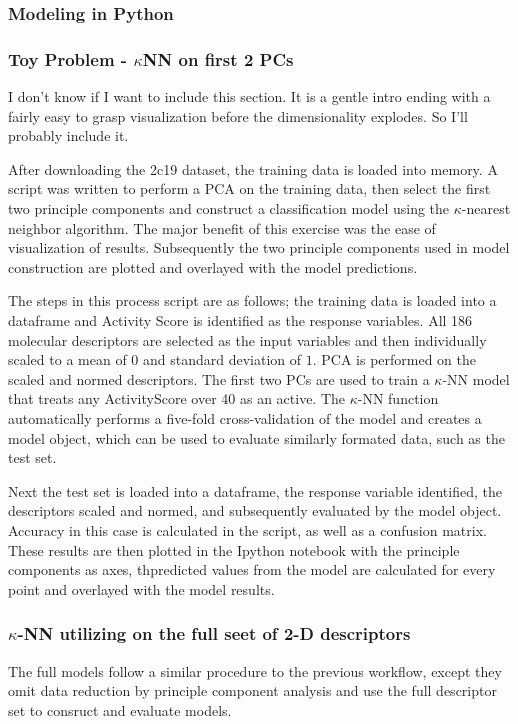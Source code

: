 \subsubsection{Modeling in Python}
\subsubsection{Toy Problem - $\kappa$NN on first 2 PCs}
I don't know if I want to include this section. It is a gentle intro ending with a fairly easy to grasp visualization before the dimensionality explodes. So I'll probably include it.

After downloading the 2c19 dataset, the training data is loaded into memory. A script was written to perform a PCA on the training data, then select the first two principle components and construct a classification model using the $\kappa$-nearest neighbor algorithm. The major benefit of this exercise was the ease of visualization of results. Subsequently the two principle components used in model construction are plotted and overlayed with the model predictions.

The steps in this process script are as follows; the training data is loaded into a dataframe and Activity Score is identified as the response variables. All 186 molecular descriptors are selected as the input variables and then individually scaled to a mean of $0$ and standard deviation of $1$. PCA is performed on the scaled and normed descriptors. The first two PCs are used to train a $\kappa$-NN model that treats any ActivityScore over 40 as an active. The $\kappa$-NN function automatically performs a five-fold cross-validation of the model and creates a model object, which can be used to evaluate similarly formated data, such as the test set.

Next the test set is loaded into a dataframe, the response variable identified, the descriptors scaled and normed, and subsequently evaluated by the model object. Accuracy in this case is calculated in the script, as well as a confusion matrix. These results are then plotted in the Ipython notebook with the principle components as axes, thpredicted values from the model are calculated for every point and overlayed with the model results.

\subsubsection{$\kappa$-NN utilizing on the full seet of 2-D descriptors}
The full models follow a similar procedure to the previous workflow, except they omit data reduction by principle component analysis and use the full descriptor set to consruct and evaluate models. 

